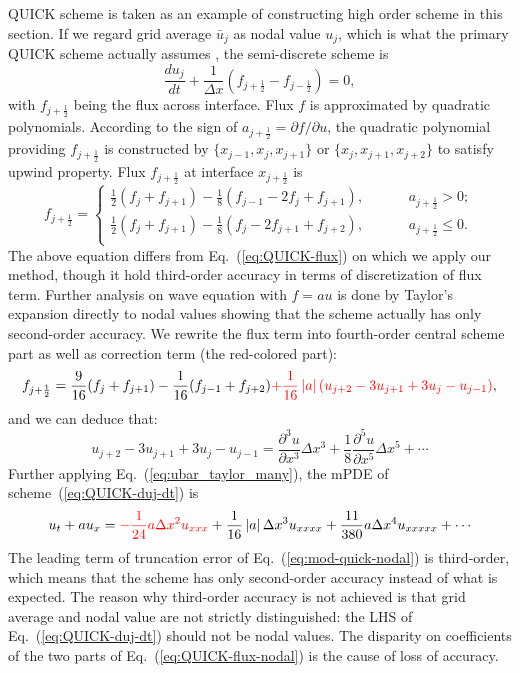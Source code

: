 \documentclass[]{article}
\def\jph{{j+\frac{1}{2}}}
\def\jmh{{j-\frac{1}{2}}}
\def\abs#1{\left|#1\right|}
\begin{document}
QUICK scheme is taken as an example of constructing high order scheme in this
section.  
If we regard grid average $\bar u_j$ as nodal value $u_j$, which is what the primary QUICK
scheme actually assumes \cite{leonard1979stable}, the semi-discrete scheme is
\begin{equation}
\frac{d u_j}{d t}+\frac{1}{\Delta x}\left(f_{\jph}-f_{\jmh}\right)=0,
\label{eq:QUICK-duj-dt}
\end{equation}
with $f_\jph$ being the flux across interface. Flux $f$ is approximated by
quadratic polynomials. According to the sign of $a_\jph = \partial f/\partial
u$, the quadratic polynomial providing $f_\jph$ is constructed by $\{ x_{j-1}, x_j,
x_{j+1}
\}$ or $\{ x_j, x_{j+1}, x_{j+2} \}$ to satisfy upwind
property. Flux $f_\jph$ at interface $x_\jph$ is
\begin{equation*}
f_{\jph}=\left\{\begin{array}{ll}
\displaystyle
\frac{1}{2}(f_j+f_{j+1})-\frac{1}{8}(f_{j-1}-2f_j+f_{j+1}),\hspace{1cm} & a_{\jph}>0;\\[3mm]
\displaystyle
\frac{1}{2}(f_j+f_{j+1})-\frac{1}{8}(f_j-2f_{j+1}+f_{j+2}),\hspace{1cm}
& a_{\jph}\leq 0.\\
\end{array}
\right.
\end{equation*}
The above equation differs from Eq.~(\ref{eq:QUICK-flux}) on which we apply our
method, though it hold
third-order accuracy in terms of discretization of flux term. Further analysis on wave
equation with $f=au$ is done
by Taylor's expansion directly to nodal values showing that the scheme
actually has only second-order accuracy. We rewrite the flux term into
fourth-order central scheme part as well as correction term (the red-colored part):
\begin{equation}
f_{\jph}=\frac{9}{16}(f_j+f_{j+1})-\frac{1}{16}(f_{j-1}+f_{j+2}){\color{red}+\frac{1}{16}\abs{a}(u_{j+2}-3u_{j+1}+3u_{j}-u_{j-1})},
\label{eq:QUICK-flux-nodal}
\end{equation}
and we can deduce that:
\[
u_{j+2}-3u_{j+1}+3u_{j}-u_{j-1}=\frac{\partial^3 u}{\partial x^3}\Delta x^3+\frac{1}{8}\frac{\partial^5 u}{\partial x^5}\Delta x^5+\cdots
\]
Further applying Eq.~(\ref{eq:ubar_taylor_many}), the mPDE of
scheme~(\ref{eq:QUICK-duj-dt}) is 
\begin{equation}
u_t+au_x={\color{red}-\frac{1}{24}a\Delta x^2 u_{xxx}}+\frac{1}{16}\abs{a}\Delta x^3 u_{xxxx}+\frac{11}{380}a\Delta x^4 u_{xxxxx} +\cdots
\label{eq:mod-quick-nodal}
\end{equation}
The leading term of truncation error of Eq.~(\ref{eq:mod-quick-nodal}) is
third-order, which means that the scheme has only second-order accuracy instead
of what is expected. The reason why third-order accuracy is not achieved is that
grid average and nodal value are not strictly distinguished: the LHS of
Eq.~(\ref{eq:QUICK-duj-dt}) should not be nodal values. The disparity on
coefficients of the two parts of Eq.~(\ref{eq:QUICK-flux-nodal}) is the cause of loss of
accuracy.
\end{document}
